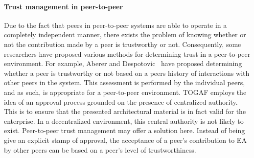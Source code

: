\paragraph*{Trust management in peer-to-peer}
%
%
Due to the fact that peers in peer-to-peer systems are able to operate in a completely independent manner, there exists the problem of knowing whether or not the contribution made by a peer is trustworthy or not. Consequently, some researchers have proposed various methods for determining trust in a peer-to-peer environment.
%
%
For example, Aberer and Despotovic~\cite{aberer2001managing} have proposed determining whether a peer is trustworthy or not based on a peers history of interactions with other peers in the system. This assessment is performed by the individual peers, and as such, is appropriate for a peer-to-peer environment.
%
%
TOGAF employs the idea of an approval process grounded on the presence of centralized authority. This is to ensure that the presented architectural material is in fact valid for the enterprise. In a decentralized environment, this central authority is not likely to exist. Peer-to-peer trust management may offer a solution here. Instead of being give an explicit stamp of approval, the acceptance of a peer's contribution to EA by other peers can be based on a peer's level of trustworthiness. 
%
%






%
%
%
%
%

